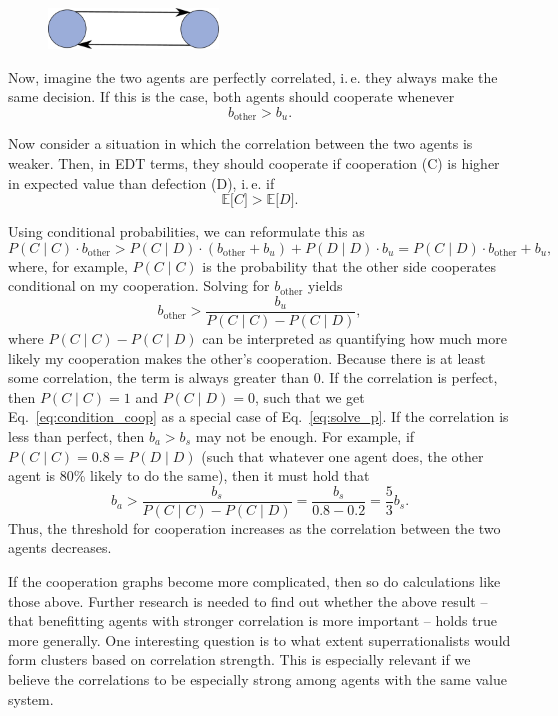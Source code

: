 \begin{figure}[h!]
    \centering
    \includegraphics[width=1.78in]{figs/mutual-cooperation-graph}
\end{figure}

Now, imagine the two agents are perfectly correlated, i.\,e. they always
make the same decision. If this is the case, both agents should
cooperate whenever
\begin{equation}
    b_{\text{other}} > b_{u}.
    \label{eq:condition_coop}
\end{equation}

Now consider a situation in which the correlation between the two agents
is weaker. Then, in EDT terms, they should cooperate if cooperation (C)
is higher in expected value than defection (D), i.\,e. if
$$
\mathbb{E}\lbrack C\rbrack > \mathbb{E}\lbrack D\rbrack.
$$

Using conditional probabilities, we can reformulate this as
$$
P(C\mid C) \cdot b_{\text{other}} > P(C\mid D) \cdot (b_{\text{other}} + b_{u}) + P(D\mid D) \cdot b_{u} =
P(C\mid D) \cdot b_{\text{other}} + b_{u},
$$
where, for example, \(P(C\mid C)\) is the probability that the other side
cooperates conditional on my cooperation. Solving for \(b_{\text{other}}\) yields
\begin{equation}
    b_{\text{other}} > \frac{b_{u}}{P(C\mid C) - P(C\mid D)},
    \label{eq:solve_p}
\end{equation}
where \(P(C\mid C) - P(C\mid D)\) can be interpreted as quantifying how much
more likely my cooperation makes the other's cooperation. Because there
is at least some correlation, the term is always greater than 0. If the
correlation is perfect, then \(P(C\mid C) = 1\) and \(P(C\mid D) = 0\), such
that we get Eq.~\eqref{eq:condition_coop} as a special case of Eq.~\eqref{eq:solve_p}. If the correlation is less
than perfect, then \(b_{a} > b_{s}\) may not be enough. For example, if
\(P(C\mid C) = 0.8 = P(D\mid D)\) (such that whatever one agent does, the other
agent is 80\% likely to do the same), then it must hold that
$$
b_{a} > \frac{b_{s}}{P(C\mid C) - P(C\mid D)} = \frac{b_{s}}{0.8 - 0.2} = \frac{5}{3}b_{s}.
$$
Thus, the threshold for cooperation increases as the correlation between
the two agents decreases.

If the cooperation graphs become more complicated, then so do
calculations like those above. Further research is needed to find out
whether the above result -- that benefitting agents with stronger
correlation is more important -- holds true more generally. One
interesting question is to what extent superrationalists would form
clusters based on correlation strength. This is especially relevant if
we believe the correlations to be especially strong among agents with
the same value system.


